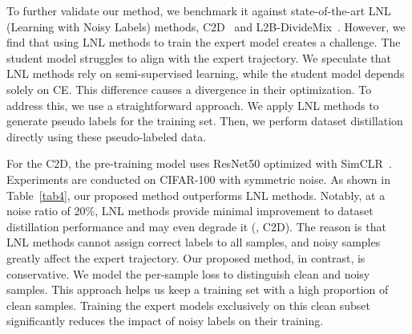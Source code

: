 To further validate our method, we benchmark it against state-of-the-art LNL (Learning with Noisy Labels) methods, C2D~\cite{zheltonozhskii2022contrast} and L2B-DivideMix~\cite{zhou2024l2b}.
However, we find that using LNL methods to train the expert model creates a challenge. 
The student model struggles to align with the expert trajectory.
We speculate that LNL methods rely on semi-supervised learning, while the student model depends solely on CE. 
This difference causes a divergence in their optimization.
To address this, we use a straightforward approach.
We apply LNL methods to generate pseudo labels for the training set. 
Then, we perform dataset distillation directly using these pseudo-labeled data.


For the C2D, the pre-training model uses ResNet50 optimized with SimCLR~\cite{chen2020simple}.
Experiments are conducted on CIFAR-100 with symmetric noise.
As shown in Table~\ref{tab4}, our proposed method outperforms LNL methods.
Notably, at a noise ratio of 20\%, LNL methods provide minimal improvement to dataset distillation performance and may even degrade it (\eg, C2D).
The reason is that LNL methods cannot assign correct labels to all samples, and noisy samples greatly affect the expert trajectory.
Our proposed method, in contrast, is conservative. 
We model the per-sample loss to distinguish clean and noisy samples.
This approach helps us keep a training set with a high proportion of clean samples.
Training the expert models exclusively on this clean subset significantly reduces the impact of noisy labels on their training.
